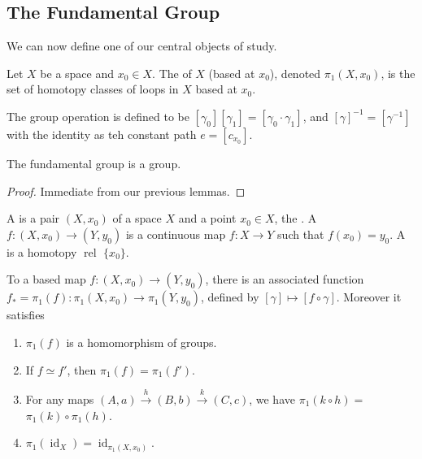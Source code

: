 \documentclass[a4paper, 10pt, twocolumn]{amsart}
\newcommand{\id}{\operatorname{id}}
\newcommand{\rel}{\operatorname{rel}}
\begin{document}
\subsection{The Fundamental Group}

We can now define one of our central objects of study.

\begin{definition}
  Let $X$ be a space and $x_0 \in X$. The  of $X$ (based at $x_0$), denoted $\pi_1(X, x_0)$, is the set of homotopy classes of loops in $X$ based at $x_0$. 
  
  The group operation is defined to be $[\gamma_0][\gamma_1] = [\gamma_0 \cdot \gamma_1]$, and $[\gamma]^{-1} = [\gamma^{-1}]$ with the identity as teh constant path $e = [c_{x_0}]$.
\end{definition}

\begin{theorem}
  The fundamental group is a group.
\end{theorem}
\begin{proof}
  Immediate from our previous lemmas.
\end{proof}


\begin{definition}
A  is a pair $(X, x_0)$ of a space $X$ and a point $x_0 \in X$, the . A  $f: (X, x_0) \rightarrow (Y, y_0)$ is a continuous map $f: X \rightarrow Y$ such that $f(x_0) = y_0$. A  is a homotopy $\rel$ $\{x_0\}$.
\end{definition}

\begin{proposition}[$\pi_1$ is a Functor]
  To a based map $f: (X, x_0) \rightarrow (Y, y_0)$, there is an associated function
  $f_* = \pi_1(f): \pi_1(X, x_0) \rightarrow \pi_1(Y, y_0)$, defined by $[\gamma] \mapsto [f \circ \gamma]$. Moreover it satisfies
  \begin{enumerate}
    \item $\pi_1(f)$ is a homomorphism of groups.
    \item If $f \simeq f'$, then $\pi_1(f) = \pi_1(f')$. 
    \item For any maps $(A, a) \stackrel{h}{\longrightarrow}(B, b) \stackrel{k}{\longrightarrow}(C, c)$, we have $\pi_1(k \circ h)=$ $\pi_1(k) \circ \pi_1(h)$.
    \item $\pi_1(\id_X) = \id_{\pi_1(X, x_0)}$.
  \end{enumerate}
\end{proposition}
\end{document}

